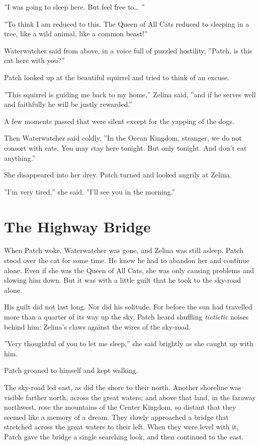 \documentclass[12pt]{book}
\begin{document}
''I was going to sleep here. But feel free to\ldots{} ''

''To think I am reduced to this. The Queen of All Cats reduced to
sleeping in a tree, like a wild animal, like a common beast!''

Waterwatcher said from above, in a voice full of puzzled hostility,
''Patch, is this cat here with you?''

Patch looked up at the beautiful squirrel and tried to think of an
excuse.

''This squirrel is guiding me back to my home,'' Zelina said, ''and if
he serves well and faithfully he will be justly rewarded.''

A few moments passed that were silent except for the yapping of the
dogs.

Then Waterwatcher said coldly, ''In the Ocean Kingdom, stranger, we do
not consort with cats. You may stay here tonight. But only
tonight. And don't eat anything.''

She disappeared into her drey. Patch turned and looked angrily at
Zelina.

''I'm very tired,'' she said. ''I'll see you in the morning.''


\section{The Highway Bridge}

When Patch woke, Waterwatcher was gone, and Zelina was still
asleep. Patch stood over the cat for some time. He knew he had to
abandon her and continue alone. Even if she was the Queen of All Cats,
she was only causing problems and slowing him down. But it was with a
little guilt that he took to the sky-road alone.

His guilt did not last long. Nor did his solitude. For before the sun
had travelled more than a quarter of its way up the sky, Patch heard
shuffling \textit{tictictic} noises behind him: Zelina's claws against
the wires of the sky-road.

''Very thoughtful of you to let me sleep,'' she said brightly as she
caught up with him.

Patch groaned to himself and kept walking.

The sky-road led east, as did the shore to their north. Another
shoreline was visible farther north, across the great waters; and
above that land, in the faraway northwest, rose the mountains of the
Center Kingdom, so distant that they seemed like a memory of a
dream. They slowly approached a bridge that stretched across the great
waters to their left. When they were level with it, Patch gave the
bridge a single searching look, and then continued to the east.
\end{document}

